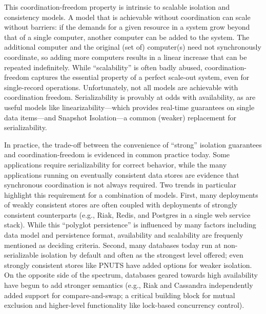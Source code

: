 

This coordination-freedom property is intrinsic to scalable isolation
and consistency models. A model that is achievable without
coordination can scale without barriers: if the demands for a given
resource in a system grow beyond that of a single computer, another
computer can be added to the system. The additional computer and the
original (set of) computer(s) need not synchronously coordinate, so
adding more computers results in a linear increase that can be
repeated indefinitely. While ``scalability'' is often badly abused,
coordination-freedom captures the essential property of a perfect
scale-out system, even for single-record operations.  Unfortunately,
not all models are achievable with coordination
freedom. Serializability is provably at odds with availability, as are
useful models like linearizability---which provides real-time
guarantees on single data items---and Snapshot Isolation---a common
(weaker) replacement for serializability.


 In practice, the
trade-off between the convenience of ``strong'' isolation guarantees
and coordination-freedom is evidenced in common practice today. Some
applications require serializability for correct behavior, while the
many applications running on eventually consistent data stores are
evidence that synchronous coordination is not always required. Two
trends in particular highlight this requirement for a combination of
models. First, many deployments of weakly consistent stores are often
coupled with deployments of strongly consistent counterparts (e.g.,
Riak, Redis, and Postgres in a single web service stack). While this
``polyglot persistence'' is influenced by many factors including data
model and persistence format, availability and scalability are
frequenly mentioned as deciding criteria. Second, many databases today
run at non-serializable isolation by default and often as the
strongest level offered; even strongly consistent stores like PNUTS
have added options for weaker isolation. On the opposite side of the
spectrum, databases geared towards high availability have begun to add
stronger semantics (e.g., Riak and Cassandra independently added
support for compare-and-swap; a critical building block for mutual
exclusion and higher-level functionality like lock-based concurrency
control).

